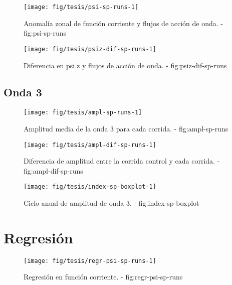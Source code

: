 \documentclass[spanish,a4paper]{book}
\begin{document}
\begin{landscape}\begin{figure}

{\centering \texttt{[image: fig/tesis/psi-sp-runs-1]} 

}

\caption{Anomalía zonal de función corriente y flujos de acción de onda. - fig:psi-sp-runs}\label{fig:psi-sp-runs}
\end{figure}
\end{landscape}

\begin{figure*}
\texttt{[image: fig/tesis/psiz-dif-sp-runs-1]} \caption{Diferencia en psi.z y flujos de acción de onda. - fig:psiz-dif-sp-runs}\label{fig:psiz-dif-sp-runs}
\end{figure*}

\subsection{Onda 3}\label{onda-3-2}

\begin{figure*}
\texttt{[image: fig/tesis/ampl-sp-runs-1]} \caption{Amplitud media de la onda 3 para cada corrida. - fig:ampl-sp-runs}\label{fig:ampl-sp-runs}
\end{figure*}

\begin{figure*}
\texttt{[image: fig/tesis/ampl-dif-sp-runs-1]} \caption{Diferencia de amplitud entre la corrida control y cada corrida. - fig:ampl-dif-sp-runs}\label{fig:ampl-dif-sp-runs}
\end{figure*}

\begin{figure*}
\texttt{[image: fig/tesis/index-sp-boxplot-1]} \caption{Ciclo anual de amplitud de onda 3. - fig:index-sp-boxplot}\label{fig:index-sp-boxplot}
\end{figure*}

\section{Regresión}\label{regresion}

\begin{figure*}
\texttt{[image: fig/tesis/regr-psi-sp-runs-1]} \caption{Regresión en función corriente. - fig:regr-psi-sp-runs}\label{fig:regr-psi-sp-runs}
\end{figure*}
\end{document}
